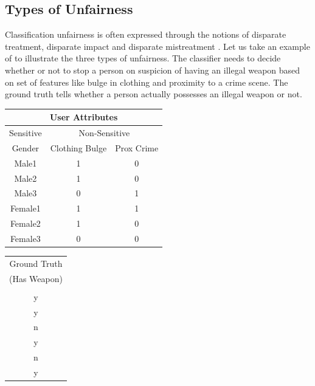 \documentclass[runningheads]{llncs}
\begin{document}
\subsection{Types of Unfairness}
Classification unfairness is often expressed through the notions of disparate treatment, disparate impact and disparate mistreatment \cite{zafar2015fairness}. Let us take an example of \cite{zafar2017fairness} to illustrate the three types of unfairness. The classifier needs to decide whether or not to stop a person on suspicion of having an illegal weapon based on set of features like bulge in clothing and proximity to a crime scene. The ground truth tells whether a person actually possesses an illegal weapon or not. 
\begin{table}[!htbp]
    \begin{minipage}{.40\linewidth}
      \centering
\begin{tabular}{c|c|c}
\hline
\multicolumn{3}{c}{User Attributes}\\
\hline
Sensitive & \multicolumn{2}{c}{Non-Sensitive} \\
\hline
Gender   & Clothing Bulge    & Prox Crime\\
\hline
Male1   &  1 & 0\\
\hline
Male2   &  1 & 0\\
\hline
Male3   &  0 & 1\\
\hline
Female1   &  1 & 1\\
\hline
Female2   &  1 & 0\\
\hline
Female3   &  0 & 0\\
\hline
\end{tabular}
\end{minipage}%
    \begin{minipage}{.40\linewidth}
      \centering
        \begin{tabular}{c}
        \hline
Ground Truth \\
(Has Weapon) \\
\\
\hline
y\\
\hline
y\\
\hline
n\\
\hline
y\\
\hline
n\\
\hline
y\\
\hline
\end{tabular}
\end{minipage}%
    \begin{minipage}{.20\linewidth}
      \centering
        \begin{tabular}{c|c|c}

\end{tabular}
\end{minipage}
\end{table}
\end{document}
